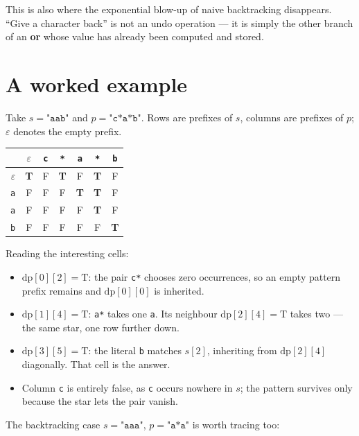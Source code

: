 \documentclass[11pt,a4paper]{article}
\newcommand{\T}{\cellcolor{truecell}\textbf{T}}
\newcommand{\F}{\cellcolor{falsecell}F}
\begin{document}
This is also where the exponential blow-up of naive backtracking disappears. ``Give a character
back'' is not an undo operation --- it is simply the other branch of an \textbf{or} whose value has
already been computed and stored.

\section{A worked example}

Take $s = \texttt{"aab"}$ and $p = \texttt{"c*a*b"}$. Rows are prefixes of $s$, columns are
prefixes of $p$; $\varepsilon$ denotes the empty prefix.

\begin{center}
\renewcommand{\arraystretch}{1.35}
\begin{tabular}{r|cccccc}
  & $\varepsilon$ & \texttt{c} & \texttt{*} & \texttt{a} & \texttt{*} & \texttt{b}\\
  \midrule
  $\varepsilon$ & \T & \F & \T & \F & \T & \F\\
  \texttt{a}    & \F & \F & \F & \T & \T & \F\\
  \texttt{a}    & \F & \F & \F & \F & \T & \F\\
  \texttt{b}    & \F & \F & \F & \F & \F & \T\\
\end{tabular}
\end{center}

Reading the interesting cells:

\begin{itemize}
  \item $\mathrm{dp}[0][2] = \text{T}$: the pair \texttt{c*} chooses zero occurrences, so an empty
        pattern prefix remains and $\mathrm{dp}[0][0]$ is inherited.
  \item $\mathrm{dp}[1][4] = \text{T}$: \texttt{a*} takes one \texttt{a}. Its neighbour
        $\mathrm{dp}[2][4] = \text{T}$ takes two --- the same star, one row further down.
  \item $\mathrm{dp}[3][5] = \text{T}$: the literal \texttt{b} matches $s[2]$, inheriting from
        $\mathrm{dp}[2][4]$ diagonally. That cell is the answer.
  \item Column \texttt{c} is entirely false, as \texttt{c} occurs nowhere in $s$; the pattern
        survives only because the star lets the pair vanish.
\end{itemize}

The backtracking case $s = \texttt{"aaa"}$, $p = \texttt{"a*a"}$ is worth tracing too:
\end{document}
